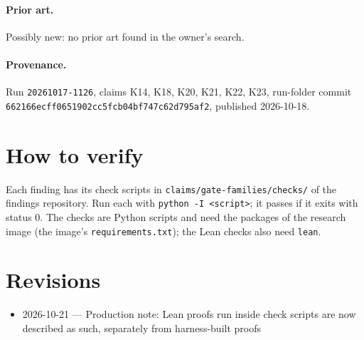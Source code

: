 \documentclass{article}
\begin{document}
\paragraph{Prior art.} Possibly new: no prior art found in the owner's search.

\paragraph{Provenance.}
Run \texttt{20261017-1126}, claims K14, K18, K20, K21, K22, K23, run-folder commit \texttt{662166ecff0651902cc5fcb04bf747c62d795af2}, published 2026-10-18.

\section{How to verify}

Each finding has its check scripts in \texttt{claims/gate-families/checks/} of the findings repository. Run each with \texttt{python -I <script>}; it passes if it exits with status 0. The checks are Python scripts and need the packages of the research image (the image's \texttt{requirements.txt}); the Lean checks also need \texttt{lean}.

\section{Revisions}

\begin{itemize}
\item 2026-10-21 --- Production note: Lean proofs run inside check scripts are now described as such, separately from harness-built proofs
\end{itemize}



\end{document}
